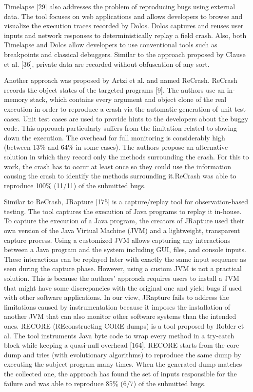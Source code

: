 \documentclass[12pt]{report}
\begin{document}
Timelapse {[}29{]} also addresses the problem of reproducing bugs using
external data. The tool focuses on web applications and allows
developers to browse and visualize the execution traces recorded by
Dolos. Dolos captures and reuses user inputs and network responses to
deterministically replay a field crash. Also, both Timelapse and Dolos
allow developers to use conventional tools such as breakpoints and
classical debuggers. Similar to the approach proposed by Clause et al.
{[}36{]}, private data are recorded without obfuscation of any sort.

Another approach was proposed by Artzi et al. and named ReCrash. ReCrash
records the object states of the targeted programs {[}9{]}. The authors
use an in-memory stack, which contains every argument and object clone
of the real execution in order to reproduce a crash via the automatic
generation of unit test cases. Unit test cases are used to provide hints
to the developers about the buggy code. This approach particularly
suffers from the limitation related to slowing down the execution. The
overhead for full monitoring is considerably high (between 13\% and 64\%
in some cases). The authors propose an alternative solution in which
they record only the methods surrounding the crash. For this to work,
the crash has to occur at least once so they could use the information
causing the crash to identify the methods surrounding it.ReCrash was
able to reproduce 100\% (11/11) of the submitted bugs.

Similar to ReCrash, JRapture {[}175{]} is a capture/replay tool for
observation-based testing. The tool captures the execution of Java
programs to replay it in-house. To capture the execution of a Java
program, the creators of JRapture used their own version of the Java
Virtual Machine (JVM) and a lightweight, transparent capture process.
Using a customized JVM allows capturing any interactions between a Java
program and the system including GUI, files, and console inputs. These
interactions can be replayed later with exactly the same input sequence
as seen during the capture phase. However, using a custom JVM is not a
practical solution. This is because the authors' approach requires users
to install a JVM that might have some discrepancies with the original
one and yield bugs if used with other software applications. In our
view, JRapture fails to address the limitations caused by
instrumentation because it imposes the installation of another JVM that
can also monitor other software systems than the intended ones. RECORE
(REconstructing CORE dumps) is a tool proposed by Robler et al. The tool
instruments Java byte code to wrap every method in a try-catch block
while keeping a quasi-null overhead {[}164{]}. RECORE starts from the
core dump and tries (with evolutionary algorithms) to reproduce the same
dump by executing the subject program many times. When the generated
dump matches the collected one, the approach has found the set of inputs
responsible for the failure and was able to reproduce 85\% (6/7) of the
submitted bugs.
\end{document}
